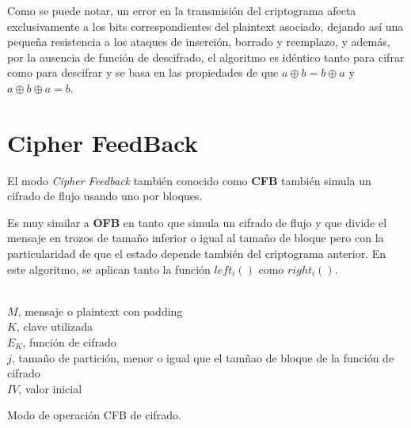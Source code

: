 Como se puede notar, un error en la transmisión del criptograma afecta exclusivamente a los bits correspondientes del plaintext asociado, dejando así una pequeña resistencia a los ataques de inserción, borrado y reemplazo, y además, por la ausencia de función de descifrado, el algoritmo es idéntico tanto para cifrar como para descifrar y se basa en las propiedades de que $a \oplus b = b \oplus a$ y $a \oplus b \oplus a = b$.

\section{Cipher FeedBack}
\label{sec:CFB}
El modo \textit{Cipher Feedback} también conocido como \textbf{CFB} también simula un cifrado de flujo usando uno por bloques.

Es muy similar a \textbf{OFB} en tanto que simula un cifrado de flujo y que divide el mensaje en trozos de tamaño inferior o igual al tamaño de bloque pero con la particularidad de que el estado depende también del criptograma anterior. En este algoritmo, se aplican tanto la función $left_i()$ como $right_i()$.

\begin{algorithm}[H]
	\begin{algorithmic}[1]
		\small
		\REQUIRE \ \\
			\texttt{$M$}, mensaje o plaintext con padding\\
			\texttt{$K$}, clave utilizada\\
			\texttt{$E_K$}, función de cifrado\\
			\texttt{$j$}, tamaño de partición, menor o igual que el tamñao de bloque de la función de cifrado\\
			\texttt{$IV$}, valor inicial
		
		\ENDFOR
	\end{algorithmic}

	\caption{Modo de operación CFB de cifrado.}
	\label{alg:CFB}
\end{algorithm}

